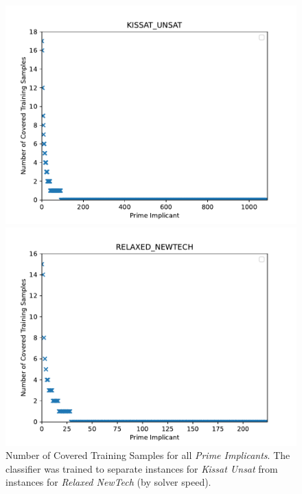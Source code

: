 \documentclass[a4paper, USenglish, cleveref, autoref, thm-restate]{lipics-v2021}
\theoremstyle{definition}
\begin{document}
\begin{figure}
\begin{minipage}{.49\linewidth}
\includegraphics[width=\linewidth]{fig2/random-forest-2-kissat-unsat.pdf}
\end{minipage}
\begin{minipage}{.49\linewidth}
\includegraphics[width=\linewidth]{fig2/random-forest-2-relaxed-newtech.pdf}
\end{minipage}
\caption{Number of Covered Training Samples for all \emph{Prime Implicants}. The classifier was trained to separate instances for \emph{Kissat Unsat} from instances for \emph{Relaxed NewTech} (by solver speed).}
\label{fig:eval:portfolio-rf}
\end{figure}
\end{document}
